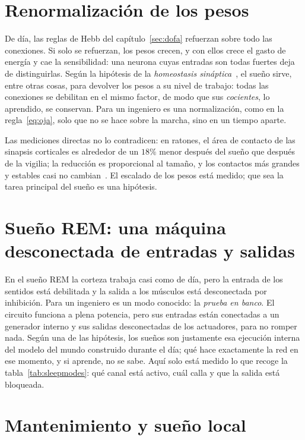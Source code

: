 \section{Renormalización de los pesos}

De día, las reglas de Hebb del capítulo~\ref{sec:dofa} refuerzan sobre todo las conexiones. Si solo se refuerzan, los pesos crecen, y con ellos crece el gasto de energía y cae la sensibilidad: una neurona cuyas entradas son todas fuertes deja de distinguirlas. Según la hipótesis de la \emph{homeostasis sináptica}~\cite{TononiCirelli2014}, el sueño sirve, entre otras cosas, para devolver los pesos a su nivel de trabajo: todas las conexiones se debilitan en el mismo factor, de modo que sus \emph{cocientes}, lo aprendido, se conservan. Para un ingeniero es una normalización, como en la regla~\eqref{eq:oja}, solo que no se hace sobre la marcha, sino en un tiempo aparte.

Las mediciones directas no lo contradicen: en ratones, el área de contacto de las sinapsis corticales es alrededor de un $18\%$ menor después del sueño que después de la vigilia; la reducción es proporcional al tamaño, y los contactos más grandes y estables casi no cambian~\cite{deVivo2017}. El escalado de los pesos está medido; que sea la tarea principal del sueño es una hipótesis.

\section{Sueño REM: una máquina desconectada de entradas y salidas}

En el sueño REM la corteza trabaja casi como de día, pero la entrada de los sentidos está debilitada y la salida a los músculos está desconectada por inhibición. Para un ingeniero es un modo conocido: la \emph{prueba en banco}. El circuito funciona a plena potencia, pero sus entradas están conectadas a un generador interno y sus salidas desconectadas de los actuadores, para no romper nada. Según una de las hipótesis, los sueños son justamente esa ejecución interna del modelo del mundo construido durante el día; qué hace exactamente la red en ese momento, y si aprende, no se sabe. Aquí solo está medido lo que recoge la tabla~\ref{tab:sleepmodes}: qué canal está activo, cuál calla y que la salida está bloqueada.

\section{Mantenimiento y sueño local}

